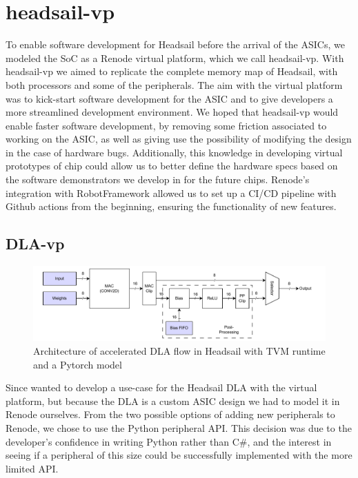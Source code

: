 \documentclass[12pt,a4paper,english
]{tunithesis}
\begin{document}
\section{headsail-vp}
To enable software development for Headsail before the arrival of the ASICs, we modeled the SoC as a Renode virtual platform, which we call headsail-vp. With headsail-vp we aimed to replicate the complete memory map of Headsail, with both processors and some of the peripherals.
The aim with the virtual platform was to kick-start software development for the ASIC and to give developers a more streamlined development environment.
We hoped that headsail-vp would enable faster software development, by removing some friction associated to working on the ASIC, as well as giving use the possibility of modifying the design in the case of hardware bugs.
Additionally, this knowledge in developing virtual prototypes of chip could allow us to better define the hardware specs based on the software demonstrators we develop in for the future chips.
Renode's integration with RobotFramework allowed us to set up a CI/CD pipeline with Github actions from the beginning, ensuring the functionality of new features.

\subsection{DLA-vp}

\begin{figure}
\centering
\includegraphics[width=\linewidth]{img/dla-internal.pdf}
\caption{Architecture of accelerated DLA flow in Headsail with TVM runtime and a Pytorch model}
\label{fig:dla_internal}
\end{figure}

Since wanted to develop a use-case for the Headsail DLA with the virtual platform, but because the DLA is a custom ASIC design we had to model it in Renode ourselves. From the two possible options of adding new peripherals to Renode, we chose to use the Python peripheral API. This decision was due to the developer's confidence in writing Python rather than C\#, and the interest in seeing if a peripheral of this size could be successfully implemented with the more limited API.
\end{document}
